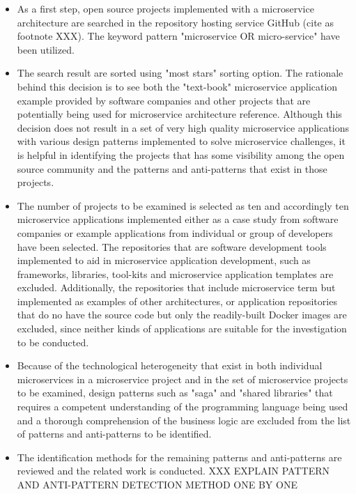 \documentclass{Configuration_Files/PoliMi3i_thesis}
\begin{document}
\begin{itemize}
    \item As a first step, open source projects implemented with a microservice architecture are searched in the repository hosting service GitHub (cite as footnote XXX).
    The keyword pattern "microservice OR micro-service" have been utilized.

    \item The search result are sorted using "most stars" sorting option.
    The rationale behind this decision is to see both the "text-book" microservice application example provided by software companies and other projects that are potentially being used for microservice architecture reference.
    Although this decision does not result in a set of very high quality microservice applications with various design patterns implemented to solve microservice challenges, it is helpful in identifying the projects that has some visibility among the open source community and the patterns and anti-patterns that exist in those projects.
    
    \item The number of projects to be examined is selected as ten and accordingly ten microservice applications implemented either as a case study from software companies or example applications from individual or group of developers have been selected.
    The repositories that are software development tools implemented to aid in microservice application development, such as frameworks, libraries, tool-kits and microservice application templates are excluded.
    Additionally, the repositories that include microservice term but implemented as examples of other architectures, or application repositories that do no have the source code but only the readily-built Docker images are excluded, since neither kinds of applications are suitable for the investigation to be conducted.
    
    \item Because of the technological heterogeneity that exist in both individual microservices in a microservice project and in the set of microservice projects to be examined, design patterns such as "saga" and "shared libraries" that requires a competent understanding of the programming language being used and a thorough comprehension of the business logic are excluded from the list of patterns and anti-patterns to be identified.
    
    \item The identification methods for the remaining patterns and anti-patterns are reviewed and the related work is conducted.
    XXX EXPLAIN PATTERN AND ANTI-PATTERN DETECTION METHOD ONE BY ONE
\end{itemize}
\end{document}
